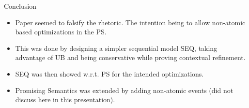 \documentclass[xcolor=dvipsnames, notes]{beamer}
\begin{document}
    \begin{frame}{Conclusion}

        \begin{itemize}
            \item Paper seemed to falsify the rhetoric. The intention being to allow non-atomic based optimizations in the PS. 
            \item This was done by designing a simpler sequential model SEQ, taking advantage of UB and being conservative while proving contextual refinement. 
            \item SEQ was then showed  w.r.t. PS for the intended optimizations.
            \item Promising Semantics was extended by adding non-atomic events (did not discuss here in this presentation).
        \end{itemize}
        
    \end{frame}
\end{document}
